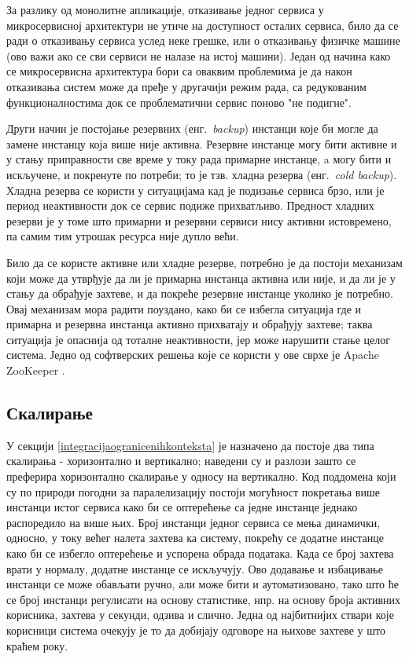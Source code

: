 \documentclass[12pt,oneside]{memoir}
\begin{document}
За разлику од монолитне апликације, отказивање једног сервиса у микросервисној архитектури не утиче на доступност осталих сервиса, било да се ради о отказивању сервиса услед неке грешке, или о отказивању физичке машине (ово важи ако се сви сервиси не налазе на истој машини). Један од начина како се микросервисна архитектура бори са оваквим проблемима је да након отказивања систем може да пређе у другачији режим рада, са редукованим функционалностима док се проблематични сервис поново "не подигне".

Други начин је постојање резервних (енг.~\textit{backup}) инстанци које би могле да замене инстанцу која више није активна. Резервне инстанце могу бити активне и у стању приправности све време у току рада примарне инстанце, a могу бити и искључене, и покренуте по потреби; то је тзв. хладна резерва (енг.~\textit{cold backup}). Хладна резерва се користи у ситуацијама кад је подизање сервиса брзо, или је период неактивности док се сервис подиже прихватљиво. Предност хладних резерви је у томе што примарни и резервни сервиси нису активни истовремено, па самим тим утрошак ресурса није дупло већи.

Било да се користе активне или хладне резерве, потребно је да постоји механизам који може да утврђује да ли је примарна инстанца активна или није, и да ли је у стању да обрађује захтеве, и да покреће резервне инстанце уколико је потребно. Овај механизам мора радити поуздано, како би се избегла ситуација где и примарна и резервна инстанца активно прихватају и обрађују захтеве; таква ситуација је опаснија од тоталне неактивности, јер може нарушити стање целог система. Једно од софтверских решења које се користи у ове сврхе је Apache ZooKeeper \cite{Zookeeper}.

\subsection{Скалирање}
У секцији \ref{integracijaogranicenihkonteksta} је назначено да постоје два типа скалирања - хоризонтално и вертикално; наведени су и разлози зашто се преферира хоризонтално скалирање у односу на вертикално. Код поддомена који су по природи погодни за паралелизацију постоји могућност покретања више инстанци истог сервиса како би се оптерећење са једне инстанце једнако распоредило на више њих. Број инстанци једног сервиса се мења динамички, односно, у току већег налета захтева ка систему, покрећу се додатне инстанце како би се избегло оптерећење и успорена обрада података. Када се број захтева врати у нормалу, додатне инстанце се искључују. Ово додавање и избацивање инстанци се може обављати ручно, али може бити и аутоматизовано, тако што ће се број инстанци регулисати на основу статистике, нпр. на основу броја активних корисника, захтева у секунди, одзива и слично. Једна од најбитнијих ствари које корисници система очекују је то да добијају одговоре на њихове захтеве у што краћем року.
\end{document}

